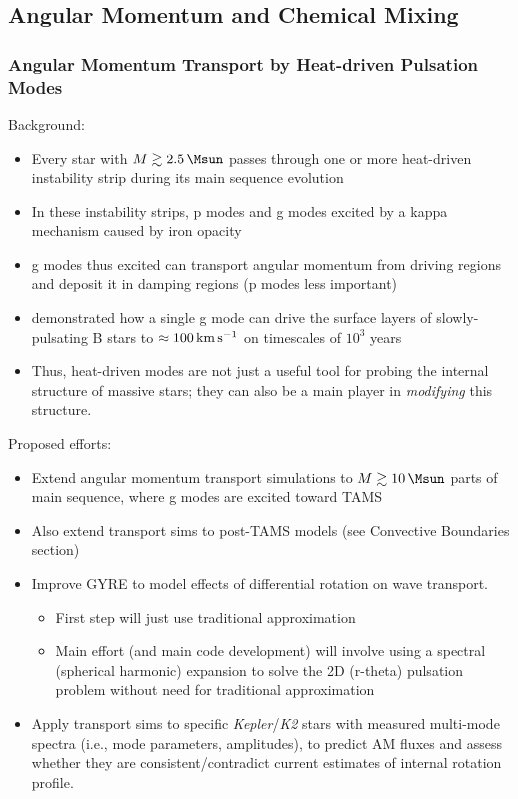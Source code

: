 
\subsection{Angular Momentum and Chemical Mixing}


{\color{brown}
\subsubsection{Angular Momentum Transport by Heat-driven Pulsation Modes}

Background:
\begin{itemize}
\item Every star with $M \gtrsim 2.5\,\Msun$ passes through one or more heat-driven instability strip during its main sequence evolution
\item In these instability strips, p modes and g modes excited by a kappa mechanism caused by iron opacity
\item g modes thus excited can transport angular momentum from driving regions and deposit it in damping regions (p modes less important)
\item \citet{Townsend:2017aa} demonstrated how a single g mode can drive the surface layers of slowly-pulsating B stars to $\approx 100\,{\rm km\,s^{-1}}$ on timescales of $10^{3}$ years
\item Thus, heat-driven modes are not just a useful tool for probing the internal structure of massive stars; they can also be a main player in \emph{modifying} this structure.
\end{itemize}

Proposed efforts:
\begin{itemize}
\item Extend angular momentum transport simulations to $M \gtrsim 10\,\Msun$ parts of main sequence, where g modes are excited toward TAMS
\item Also extend transport sims to post-TAMS models (see Convective Boundaries section)
\item Improve GYRE to model effects of differential rotation on wave transport.
\begin{itemize}
\item First step will just use traditional approximation
\item Main effort (and main code development) will involve using a spectral (spherical harmonic) expansion to solve the 2D (r-theta) pulsation problem without need for traditional approximation
\end{itemize}
\item Apply transport sims to specific \emph{Kepler}/\emph{K2} stars with measured multi-mode spectra (i.e., mode parameters, amplitudes), to predict AM fluxes and assess whether they are consistent/contradict current estimates of internal rotation profile.
\end{itemize}


}


